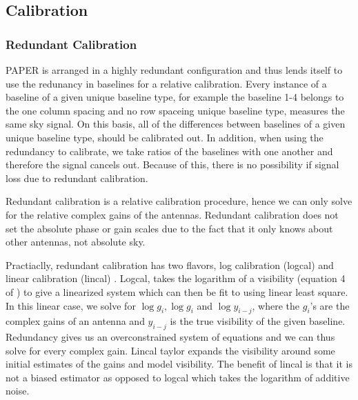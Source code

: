 \documentclass[twocolumn,numberedappendix]{emulateapj}
\begin{document}
\subsection{Calibration}
\subsubsection{Redundant Calibration}
%
%
%
%    
%

PAPER is arranged in a highly redundant configuration and thus lends itself to
use the redunancy in baselines for a relative calibration. Every instance of a
baseline of a given unique baseline type, for example the baseline 1-4 belongs
to the one column spacing and no row spaceing unique baseline type, measures the
same sky signal. On this basis, all of the differences between baselines of a
given unique baseline type, should be calibrated out. In addition, when using
the redundancy to calibrate, we take ratios of the baselines with one another
and therefore the signal cancels out. Because of this, there is no possibility
if signal loss due to redundant calibration.

Redundant calibration is a relative calibration procedure, hence we can only
solve for the relative complex gains of the antennas. Redundant calibration does
not set the absolute phase or gain scales due to the fact that it only knows
about other antennas, not absolute sky.  

Practiaclly, redundant calibration has two flavors, log calibration (logcal) and linear
calibration (lincal) \cite{liu_et_al2010,zheng_et_al2014}. Logcal, takes the
logarithm of a visibility (equation 4 of \cite{zheng_et_al2014}) to give a
linearized system which can then be fit to using linear least square. In this
linear case, we solve for $\log{g_{i}},\log{g_{i}}$ and $\log{y_{i-j}}$, where
the $g_{i}$'s are the complex gains of an antenna and $y_{i-j}$ is the true
visibility of the given baseline. Redundancy gives us an overconstrained system
of equations and we can thus solve for every complex gain. Lincal taylor expands
the visibility around some initial estimates of the gains and model visibility.
The benefit of lincal is that it is not a biased estimator as opposed to logcal
which takes the logarithm of additive noise.
\end{document}
